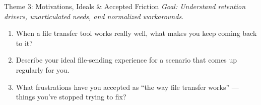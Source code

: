 \documentclass[xcolor=table,dvipsnames,svgnames,aspectratio=169]{beamer}
\begin{document}
\begin{frame}{Theme 3: Motivations, Ideals \& Accepted Friction}
  \textit{Goal: Understand retention drivers, unarticulated needs, and normalized workarounds.}

  \vspace{0.8em}

  \begin{enumerate}
    \item[\textbf{Q10}] When a file transfer tool works really well, what makes you keep coming back to it?
    \item[\textbf{Q11}] Describe your ideal file-sending experience for a scenario that comes up regularly for you.
    \item[\textbf{Q12}] What frustrations have you accepted as ``the way file transfer works'' --- things you've stopped trying to fix?
  \end{enumerate}
\end{frame}
\author{}
\title{}
\renewcommand{\bottomthanks}{\fontsize{52}{62}\selectfont\textbf{Thank You}}
\makebottom
\end{document}

